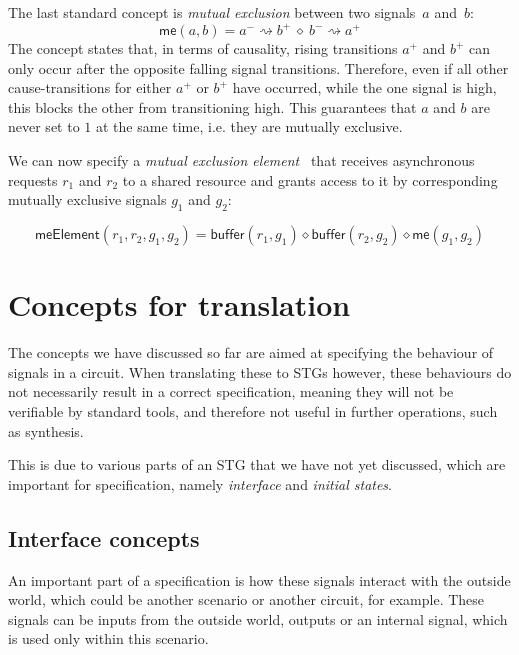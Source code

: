 \documentclass[british,conference,compsoc]{IEEEtran}
\begin{document}
The last standard concept is \emph{mutual
exclusion} between two signals~$a$ and~$b$:
\[
\mathsf{me}(a, b) = a^{-}\rightsquigarrow b^{+}\ \diamond\ b^{-}\rightsquigarrow
a^{+}
\]
The concept states that, in terms of causality, rising transitions 
$a^{+}$ and $b^{+}$ can only occur after
the opposite falling signal transitions. Therefore, even if all other cause-transitions for
either $a^{+}$ or $b^{+}$ have occurred, while the one signal is high, this blocks 
the other from transitioning high. This guarantees that $a$ and
$b$ are never set to $1$ at the same time, i.e. they are mutually
exclusive.

We can now specify a \emph{mutual exclusion
element}~\cite{2008_kinniment_synchronisation}
that receives asynchronous requests $r_{1}$ and $r_{2}$ to a shared
resource and grants access to it by corresponding mutually exclusive
signals $g_{1}$ and $g_{2}$:

{\small
\[
\mathsf{meElement}(r_{1}, r_{2}, g_{1}, g_{2})\!=\!\mathsf{buffer}(r_{1}, g_{1})
\diamond \mathsf{buffer}(r_{2}, g_{2}) \diamond \mathsf{me}(g_{1}, g_{2})
\]}


\section{Concepts for translation\label{sec:trans-concepts}}

The concepts we have discussed so far are aimed at specifying the behaviour of signals in a circuit.
When translating these to STGs however, these behaviours do not necessarily result in a correct
specification, meaning they will not be verifiable by standard tools, and therefore not useful in 
further operations, such as synthesis.

This is due to various parts of an STG that we have not yet discussed, which are important
for specification, namely \emph{interface} and \emph{initial states}.


\subsection{Interface concepts \label{sub:interface}} 

An important part of a specification is how these signals interact with the outside world, which could
be another scenario or another circuit, for example. These signals can be inputs from the outside world,
outputs or an internal signal, which is used only within this scenario. 
\end{document}
